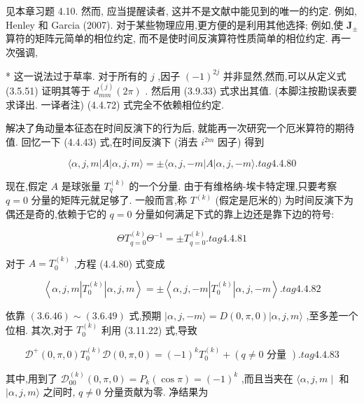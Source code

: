 见本章习题 4.10. 然而, 应当提醒读者, 这并不是文献中能见到的唯一的约定. 例如, Henley 和 Garcia (2007). 对于某些物理应用,更方便的是利用其他选择; 例如,使 ${\mathbf{J}}_{ \pm }$ 算符的矩阵元简单的相位约定, 而不是使时间反演算符性质简单的相位约定. 再一次强调,

* 这一说法过于草率. 对于所有的 $j$ ,因子 ${\left( -1\right) }^{2j}$ 并非显然,然而,可以从定义式 (3.5.51) 证明其等于 ${d}_{mm}^{\left( j\right) }\left( {2\pi }\right)$ . 然后用 (3.9.33) 式求出其值. (本脚注按勘误表要求译出. 一译者注) (4.4.72) 式完全不依赖相位约定.

解决了角动量本征态在时间反演下的行为后, 就能再一次研究一个厄米算符的期待值. 回忆一下 (4.4.43) 式,在时间反演下 (消去 ${i}^{2m}$ 因子) 得到

$$
\langle \alpha, j, m\left| A\right| \alpha, j, m\rangle = \pm \langle \alpha, j, - m\left| A\right| \alpha, j, - m\rangle . tag{4. 4.80}
$$

现在,假定 $A$ 是球张量 ${T}_{q}^{\left( k\right) }$ 的一个分量. 由于有维格纳-埃卡特定理,只要考察 $q = 0$ 分量的矩阵元就足够了. 一般而言,称 ${T}^{\left( k\right) }$ (假定是厄米的) 为时间反演下为偶还是奇的,依赖于它的 $q = 0$ 分量如何满足下式的靠上边还是靠下边的符号:

$$
\Theta {T}_{q = 0}^{\left( k\right) }{\Theta }^{-1} = \pm {T}_{q = 0}^{\left( k\right) }. tag{4. 4.81}
$$

对于 $A = {T}_{0}^{\left( k\right) }$ ,方程 (4.4.80) 式变成

$$
\left\langle {\alpha, j, m\left| {T}_{0}^{\left( k\right) }\right| \alpha, j, m}\right\rangle = \pm \left\langle {\alpha, j, - m\left| {T}_{0}^{\left( k\right) }\right| \alpha, j, - m}\right\rangle . tag{4. 4.82}
$$

依靠 $\left( {3.6.46}\right) \sim \left( {3.6.49}\right)$ 式,预期 $\left| {\alpha, j, - m\rangle = D\left( {0,\pi ,0}\right) }\right| \alpha, j, m\rangle$ ,至多差一个位相. 其次,对于 ${T}_{0}^{\left( k\right) }$ 利用 (3.11.22) 式,导致

$$
{\mathcal{D}}^{ + }\left( {0,\pi ,0}\right) {T}_{0}^{\left( k\right) }\mathcal{D}\left( {0,\pi ,0}\right) = {\left( -1\right) }^{k}{T}_{0}^{\left( k\right) } + \left( {q \neq 0\text{ 分量 }}\right) . tag{4. 4.83}
$$

其中,用到了 ${\mathcal{D}}_{00}^{\left( k\right) }\left( {0,\pi ,0}\right) = {P}_{k}\left( {\cos \pi }\right) = {\left( -1\right) }^{k}$ ,而且当夹在 $\langle \alpha, j, m \mid$ 和 $\mid \alpha, j, m\rangle$ 之间时, $q \neq 0$ 分量贡献为零. 净结果为

